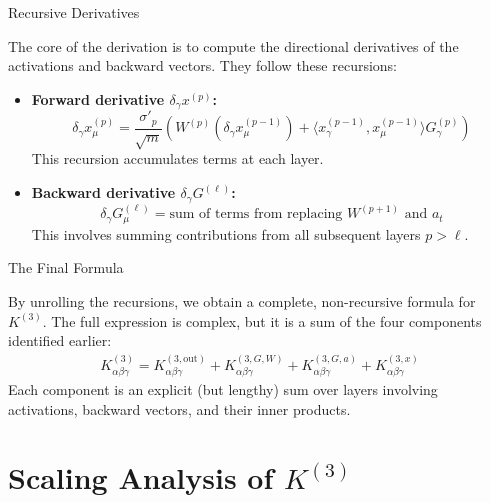 \documentclass{beamer}
\begin{document}
\begin{frame}{Recursive Derivatives}
\begin{proposition}
The core of the derivation is to compute the directional derivatives of the activations and backward vectors. They follow these recursions:
\begin{itemize}
    \item \textbf{Forward derivative $\delta_\gamma x^{(p)}$:}
    \[
    \delta_\gamma x^{(p)}_\mu = \frac{\sigma'_{p}}{\sqrt{m}} \left( W^{(p)} (\delta_\gamma x^{(p-1)}_\mu) + \langle x^{(p-1)}_\gamma, x^{(p-1)}_\mu \rangle G^{(p)}_\gamma \right)
    \]
    This recursion accumulates terms at each layer.
    
    \item \textbf{Backward derivative $\delta_\gamma G^{(\ell)}$:}
    \[
    \delta_\gamma G^{(\ell)}_\mu = \text{sum of terms from replacing } W^{(p+1)} \text{ and } a_t
    \]
    This involves summing contributions from all subsequent layers $p > \ell$.
\end{itemize}
\end{proposition}
\end{frame}

\begin{frame}{The Final Formula}
\begin{theorem}
By unrolling the recursions, we obtain a complete, non-recursive formula for $K^{(3)}$. The full expression is complex, but it is a sum of the four components identified earlier:
\begin{align*}
K^{(3)}_{\alpha\beta\gamma} = K^{(3,\text{out})}_{\alpha\beta\gamma} + K^{(3,G,W)}_{\alpha\beta\gamma} + K^{(3,G,a)}_{\alpha\beta\gamma} + K^{(3,x)}_{\alpha\beta\gamma}
\end{align*}
Each component is an explicit (but lengthy) sum over layers involving activations, backward vectors, and their inner products.
\end{theorem}
\end{frame}

\section{Scaling Analysis of $K^{(3)}$}
\end{document}

